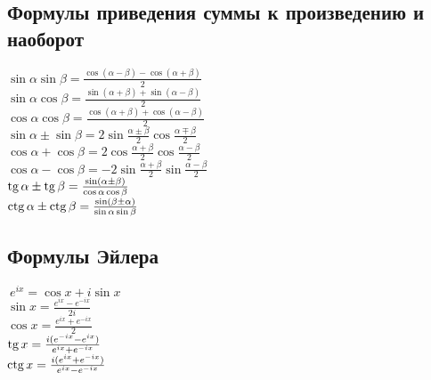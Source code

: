 \subsection{Формулы приведения суммы к произведению и наоборот}

$ \sin  \alpha  \sin  \beta = \frac{ \cos ( \alpha - \beta) -  \cos ( \alpha + \beta)}{2} $ \\
$ \sin  \alpha  \cos  \beta = \frac{ \sin ( \alpha + \beta) +  \sin ( \alpha - \beta)}{2} $ \\
$ \cos  \alpha  \cos  \beta = \frac{ \cos ( \alpha + \beta) +  \cos ( \alpha - \beta)}{2} $ \\

$ \sin  \alpha \pm  \sin  \beta = 2 \sin \frac{ \alpha \pm \beta}{2} \cos \frac{ \alpha \mp \beta}{2}$ \\
$ \cos  \alpha + \cos  \beta = 2 \cos \frac{ \alpha + \beta}{2} \cos \frac{ \alpha - \beta}{2}$ \\
$ \cos  \alpha - \cos  \beta = - 2 \sin \frac{ \alpha + \beta}{2} \sin \frac{ \alpha - \beta}{2}$ \\
$ \operatorname{tg}  \alpha \pm \operatorname{tg}  \beta = \frac{ \sin ( \alpha \pm \beta)}{ \cos  \alpha \cos  \beta}$ \\
$ \operatorname{ctg}  \alpha \pm \operatorname{ctg}  \beta = \frac{ \sin ( \beta \pm \alpha)}{ \sin  \alpha \sin  \beta}$ \\

\subsection{Формулы Эйлера}

$~e^{ix}=\cos x+i\sin x$ \\
$\sin x=\frac{e^{ix}-e^{-ix}}{2i}$ \\
$\cos x=\frac{e^{ix}+e^{-ix}}{2}$ \\
$\operatorname{tg} x = \frac{i(e^{-ix}-e^{ix})}{e^{ix}+e^{-ix}}$ \\
$\operatorname{ctg} x = \frac{i(e^{ix}+e^{-ix})}{e^{ix}-e^{-ix}}$ \\
